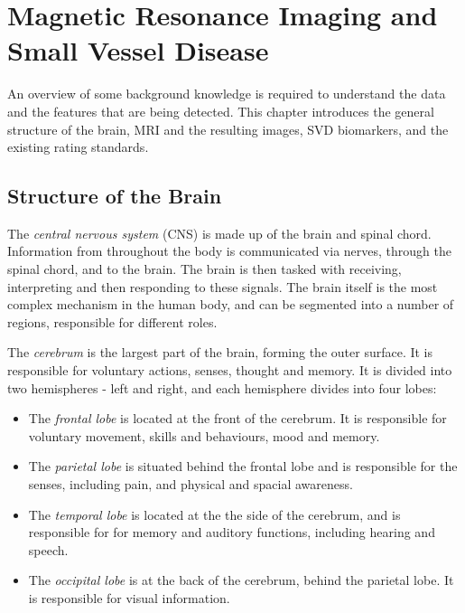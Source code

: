 %
%



\chapter{Magnetic Resonance Imaging and Small Vessel Disease}\label{mri_svd_intro}

An overview of some background knowledge is required to understand the data and the features that are being detected. This chapter introduces the general structure of the brain, MRI and the resulting images, SVD biomarkers, and the existing rating standards.

\section{Structure of the Brain}\label{svd-brain}

The \textit{central nervous system} (CNS) is made up of the brain and spinal chord. Information from throughout the body is communicated via nerves, through the spinal chord, and to the brain. The brain is then tasked with receiving, interpreting and then responding to these signals. The brain itself is the most complex mechanism in the human body, and can be segmented into a number of regions, responsible for different roles. 

The \textit{cerebrum} is the largest part of the brain, forming the outer surface. It is responsible for voluntary actions, senses, thought and memory. It is divided into two hemispheres - left and right, and each hemisphere divides into four lobes:
 \begin{itemize}
	\item The \textit{frontal lobe} is located at the front of the cerebrum. It is responsible for voluntary movement, skills and behaviours, mood and memory.
	\item The \textit{parietal lobe} is situated behind the frontal lobe and is responsible for the senses, including pain, and physical and spacial awareness.
	\item The \textit{temporal lobe} is located at the the side of the cerebrum, and is responsible for for memory and auditory functions, including hearing and speech.
	\item The \textit{occipital lobe} is at the back of the cerebrum, behind the parietal lobe. It is responsible for visual information.
\end{itemize}

